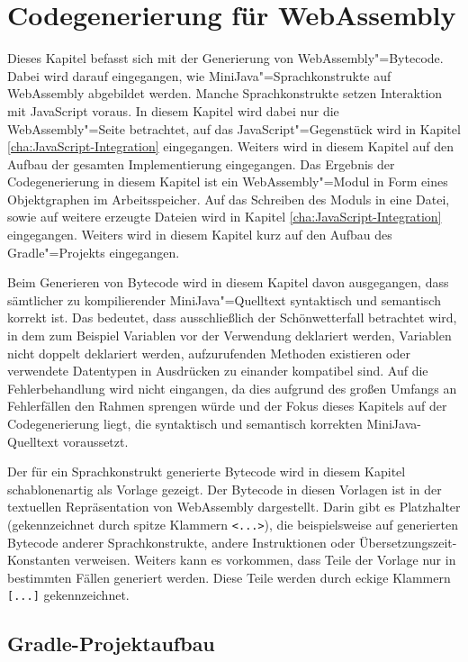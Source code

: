 \chapter{Codegenerierung für WebAssembly}
\label{cha:Codegenerierung-für-WebAssembly}

Dieses Kapitel befasst sich mit der Generierung von WebAssembly"=Bytecode. Dabei wird darauf eingegangen, wie MiniJava"=Sprachkonstrukte auf WebAssembly abgebildet werden. Manche Sprachkonstrukte setzen Interaktion mit JavaScript voraus. In diesem Kapitel wird dabei nur die WebAssembly"=Seite betrachtet, auf das JavaScript"=Gegenstück wird in Kapitel \ref{cha:JavaScript-Integration} eingegangen. Weiters wird in diesem Kapitel auf den Aufbau der gesamten Implementierung eingegangen. Das Ergebnis der Codegenerierung in diesem Kapitel ist ein WebAssembly"=Modul in Form eines Objektgraphen im Arbeitsspeicher. Auf das Schreiben des Moduls in eine Datei, sowie auf weitere erzeugte Dateien wird in Kapitel \ref{cha:JavaScript-Integration} eingegangen. Weiters wird in diesem Kapitel kurz auf den Aufbau des Gradle"=Projekts eingegangen.

Beim Generieren von Bytecode wird in diesem Kapitel davon ausgegangen, dass sämtlicher zu kompilierender MiniJava"=Quelltext syntaktisch und semantisch korrekt ist. Das bedeutet, dass ausschließlich der Schönwetterfall betrachtet wird, in dem zum Beispiel Variablen vor der Verwendung deklariert werden, Variablen nicht doppelt deklariert werden, aufzurufenden Methoden existieren oder verwendete Datentypen in Ausdrücken zu einander kompatibel sind. Auf die Fehlerbehandlung wird nicht eingangen, da dies aufgrund des großen Umfangs an Fehlerfällen den Rahmen sprengen würde und der Fokus dieses Kapitels auf der Codegenerierung liegt, die syntaktisch und semantisch korrekten MiniJava-Quelltext voraussetzt.

Der für ein Sprachkonstrukt generierte Bytecode wird in diesem Kapitel schablonenartig als Vorlage gezeigt. Der Bytecode in diesen Vorlagen ist in der textuellen Repräsentation von WebAssembly dargestellt. Darin gibt es Platzhalter (gekennzeichnet durch spitze Klammern \lstinline{<...>}), die beispielsweise auf generierten Bytecode anderer Sprachkonstrukte, andere Instruktionen oder Übersetzungszeit-Konstanten verweisen. Weiters kann es vorkommen, dass Teile der Vorlage nur in bestimmten Fällen generiert werden. Diese Teile werden durch eckige Klammern \lstinline{[...]} gekennzeichnet.

\pagebreak
\section{Gradle-Projektaufbau}


